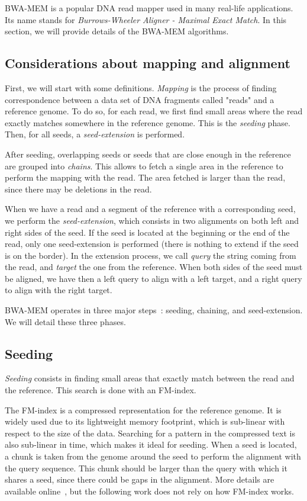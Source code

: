 
BWA-MEM is a popular DNA read mapper used in many real-life applications. Its name stands for \emph{Burrows-Wheeler Aligner - Maximal Exact Match}. In this section, we will provide details of the BWA-MEM algorithms.

\subsection{Considerations about mapping and alignment}
First, we will start with some definitions. \emph{Mapping} is the process of finding correspondence between a data set of DNA fragments called "reads" and a reference genome. To do so, for each read, we first find small areas where the read exactly matches somewhere in the reference genome. This is the \emph{seeding} phase. Then, for all seeds, a \emph{seed-extension} is performed. 

After seeding, overlapping seeds or seeds that are close enough in the reference are grouped into \emph{chains}. This allows to fetch a single area in the reference to perform the mapping with the read. The area fetched is larger than the read, since there may be deletions in the read.

When we have a read and a segment of the reference with a corresponding seed, we perform the \emph{seed-extension}, which consists in two alignments on both left and right sides of the seed. If the seed is located at the beginning or the end of the read, only one seed-extension is performed (there is nothing to extend if the seed is on the border). In the extension process, we call \emph{query} the string coming from the read, and \emph{target} the one from the reference. When both sides of the seed must be aligned, we have then a left query to align with a left target, and a right query to align with the right target.

BWA-MEM operates in three major steps~\cite{li:bwamem}: seeding, chaining, and seed-extension. We will detail these three phases.

\subsection{Seeding}
\emph{Seeding} consists in finding small areas that exactly match between the read and the reference. This search is done with an FM-index.

The FM-index is a compressed representation for the reference genome. It is widely used due to its lightweight memory footprint, which is sub-linear with respect to the size of the data. Searching for a pattern in the compressed text is also sub-linear in time, which makes it ideal for seeding. When a seed is located, a chunk is taken from the genome around the seed to perform the alignment with the query sequence. This chunk should be larger than the query with which it shares a seed, since there could be gaps in the alignment. More details are available online~\cite{wiki:FMIndex}, but the following work does not rely on how FM-index works. 

